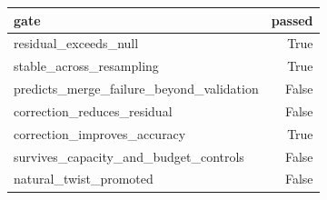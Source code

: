 \begin{tabular}{lr}
\toprule
gate & passed \\
\midrule
residual_exceeds_null & True \\
stable_across_resampling & True \\
predicts_merge_failure_beyond_validation & False \\
correction_reduces_residual & False \\
correction_improves_accuracy & True \\
survives_capacity_and_budget_controls & False \\
natural_twist_promoted & False \\
\bottomrule
\end{tabular}
